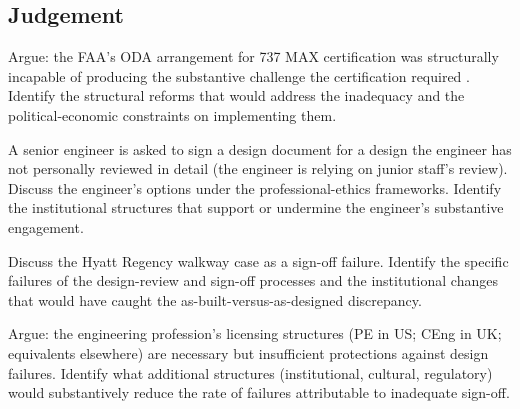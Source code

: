 \subsection*{Judgement}

\begin{exercise}
Argue: the FAA's ODA arrangement for 737 MAX certification was structurally incapable of producing the substantive challenge the certification required \cite{acc:house-737max-2020}. Identify the structural reforms that would address the inadequacy and the political-economic constraints on implementing them.
\end{exercise}

\begin{exercise}
A senior engineer is asked to sign a design document for a design the engineer has not personally reviewed in detail (the engineer is relying on junior staff's review). Discuss the engineer's options under the professional-ethics frameworks. Identify the institutional structures that support or undermine the engineer's substantive engagement.
\end{exercise}

\begin{exercise}
Discuss the Hyatt Regency walkway case as a sign-off failure. Identify the specific failures of the design-review and sign-off processes and the institutional changes that would have caught the as-built-versus-as-designed discrepancy.
\end{exercise}

\begin{exercise}
Argue: the engineering profession's licensing structures (PE in US; CEng in UK; equivalents elsewhere) are necessary but insufficient protections against design failures. Identify what additional structures (institutional, cultural, regulatory) would substantively reduce the rate of failures attributable to inadequate sign-off.
\end{exercise}
